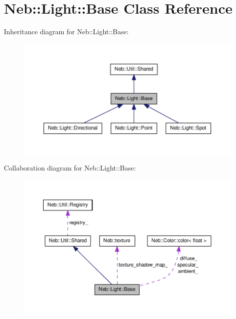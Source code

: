 \hypertarget{classNeb_1_1Light_1_1Base}{\section{\-Neb\-:\-:\-Light\-:\-:\-Base \-Class \-Reference}
\label{classNeb_1_1Light_1_1Base}
}


\-Inheritance diagram for \-Neb\-:\-:\-Light\-:\-:\-Base\-:\nopagebreak
\begin{figure}[H]
\begin{center}
\leavevmode
\includegraphics[width=350pt]{classNeb_1_1Light_1_1Base__inherit__graph}
\end{center}
\end{figure}


\-Collaboration diagram for \-Neb\-:\-:\-Light\-:\-:\-Base\-:\nopagebreak
\begin{figure}[H]
\begin{center}
\leavevmode
\includegraphics[width=350pt]{classNeb_1_1Light_1_1Base__coll__graph}
\end{center}
\end{figure}

